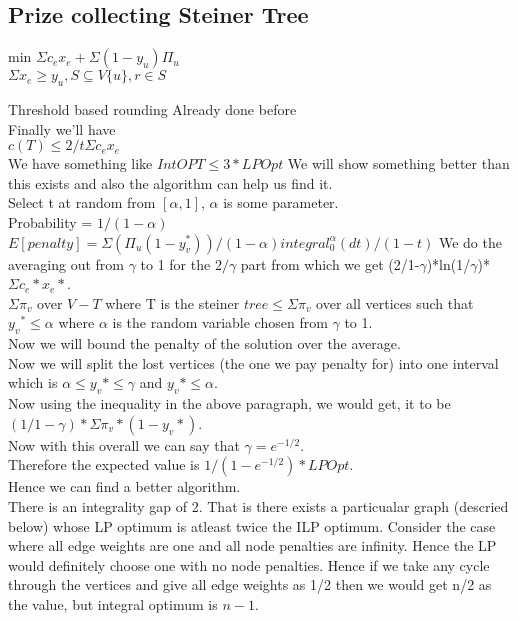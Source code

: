 \documentclass[solution,addpoints,12pt]{exam}
\begin{document}
\subsection {Prize collecting Steiner Tree}
min $\Sigma c_e x_e + \Sigma (1-y_u)\Pi_u$\\
$\Sigma x_e \ge  y_u, S \subseteq V\{u\}, r \in S$

Threshold based rounding Already done before  \\
Finally we'll have \\
$c(T) \le 2/t \Sigma c_e x_e$\\

We have something like $IntOPT \le 3*LPOpt$
We will show something better than this exists and also the algorithm can help us find it.\\

Select t at random from $[\alpha,1]$, $\alpha$ is some parameter.\\
Probability = $1/(1-\alpha)$\\

$E[penalty] = \Sigma (\Pi_u (1 - y_v^*))/(1-\alpha) integral_{0}^{\alpha} (dt)/(1-t)$
We do the averaging out from $\gamma$ to 1 for the $2/\gamma$ part from which
we get (2/1-$\gamma$)*ln(1/$\gamma$)*$\Sigma c_e*x_e*$.\\

$\Sigma \pi_v$ over $V - T $ where T is the steiner $ tree \le \Sigma
\pi_v$ over all vertices such that ${y_v}^* \le \alpha$ where $\alpha$
is the random variable chosen from $\gamma$ to 1.\\

Now we will bound the penalty of the solution over the average.\\
Now we will split the lost vertices (the one we pay penalty for) into
one interval which is $\alpha \le y_v* \le \gamma$ and $y_v* \le \alpha$.\\
Now using the inequality in the above paragraph, we would get,
it to be $(1/1-\gamma)*\Sigma \pi_v*(1 - y_v*)$.\\
Now with this overall we can say that $\gamma = e^{-1/2}$.\\
Therefore the expected value is $1/(1-e^{-1/2})* LPOpt$.\\
Hence we can find a better algorithm.\\

There is an integrality gap of 2. That is there exists a particualar
graph (descried below) whose LP optimum is atleast twice the ILP
optimum. Consider the case where all edge weights are one and all
node penalties are infinity. Hence the LP would definitely choose
one with no node penalties. Hence if we take any cycle through the vertices
and give all edge weights as 1/2 then we would get n/2 as the value, but
integral optimum is $n-1$.\\
\end{document}
